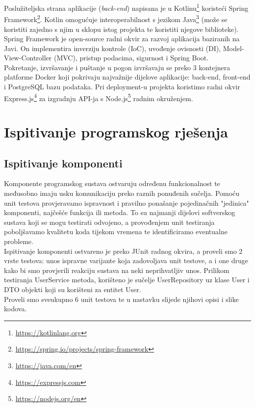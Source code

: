 Poslužiteljska strana aplikacije (\textit{back-end}) napisana je u Kotlinu\footnote{\url{https://kotlinlang.org}} koristeći Spring Framework\footnote{\url{https://spring.io/projects/spring-framework}}. Kotlin omogućuje interoperabilnost s jezikom Java\footnote{\url{https://java.com/en}} (može se koristiti zajedno s njim u sklopu istog projekta te koristiti njegove biblioteke). Spring Framework je open-source radni okvir za razvoj aplikacija baziranih na Javi. On implementira inverziju kontrole (IoC), uvođenje ovisnosti (DI), Model-View-Controller (MVC), pristup podacima, sigurnost i Spring Boot. \\
Pokretanje, izvršavanje i puštanje u pogon izvršavaju se preko 3 kontejnera platforme Docker koji pokrivaju najvažnije dijelove aplikacije: back-end, front-end i PostgreSQL bazu podataka. Pri deployment-u projekta koristimo radni okvir Express.js\footnote{\url{https://expressjs.com}} za izgradnju API-ja s Node.js\footnote{\url{https://nodejs.org/en}} radnim okruženjem.

			
			\eject 
		
	
		\section{Ispitivanje programskog rješenja}
	
			
			\subsection{Ispitivanje komponenti}
			
			Komponente programskog sustava ostvaruju određenu funkcionalnost te međusobno imaju usku komunikaciju preko raznih ponuđenih sučelja. Pomoću unit testova provjeravamo ispravnost i pravilno ponašanje pojedinačnih "jedinica" komponenti, najčešće funkcija ili metoda. To su najmanji dijelovi softverskog sustava koji se mogu testirati odvojeno, a provođenjem unit testiranja poboljšavamo kvalitetu koda tijekom vremena te identificiramo eventualne probleme. \\
			
Ispitivanje komponenti ostvareno je preko JUnit radnog okvira, a proveli smo 2 vrste testova: unos ispravne varijante koja zadovoljava unit testove, a i one druge kako bi smo provjerili reakciju sustava na neki neprihvatljiv unos.  Prilikom testiranja UserService metoda, korišteno je sučelje UserRepository uz klase User i DTO objekti koji su korišteni za entitet User.\\
Proveli smo sveukupno 6 unit testova te u nastavku slijede njihovi opisi i slike kodova.

